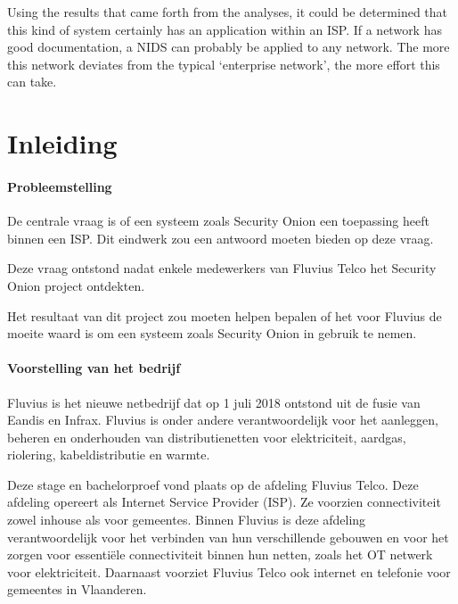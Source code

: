 \documentclass[a4paper, 12pt]{report}
\begin{document}
Using the results that came forth from the analyses, it could be determined that this kind of system certainly has an application within an ISP.
If a network has good documentation, a NIDS can probably be applied to any network.
The more this network deviates from the typical `enterprise network', the more effort this can take.

\newpage

\tableofcontents
\newpage

\listoffigures

\chapter*{Inleiding}
\subsubsection{Probleemstelling}
De centrale vraag is of een systeem zoals Security Onion een toepassing heeft binnen een ISP.
Dit eindwerk zou een antwoord moeten bieden op deze vraag.

Deze vraag ontstond nadat enkele medewerkers van Fluvius Telco het Security Onion project ontdekten.

Het resultaat van dit project zou moeten helpen bepalen of het voor Fluvius de moeite waard is om een systeem zoals Security Onion in gebruik te nemen.

\subsubsection{Voorstelling van het bedrijf}
Fluvius is het nieuwe netbedrijf dat op 1 juli 2018 ontstond uit de fusie van Eandis en Infrax.
Fluvius is onder andere verantwoordelijk voor het aanleggen, beheren en onderhouden van distributienetten voor elektriciteit, aardgas, riolering, kabeldistributie en warmte.

Deze stage en bachelorproef vond plaats op de afdeling Fluvius Telco.
Deze afdeling opereert als Internet Service Provider (ISP).
Ze voorzien connectiviteit zowel inhouse als voor gemeentes.
Binnen Fluvius is deze afdeling verantwoordelijk voor het verbinden van hun verschillende gebouwen en voor het zorgen voor essentiële connectiviteit binnen hun netten, zoals het OT netwerk voor elektriciteit.
Daarnaast voorziet Fluvius Telco ook internet en telefonie voor gemeentes in Vlaanderen.
\end{document}
